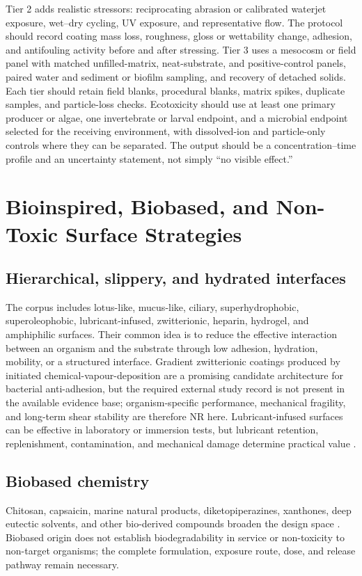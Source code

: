 Tier 2 adds realistic stressors: reciprocating abrasion or calibrated waterjet exposure, wet--dry cycling, UV exposure, and representative flow. The protocol should record coating mass loss, roughness, gloss or wettability change, adhesion, and antifouling activity before and after stressing. Tier 3 uses a mesocosm or field panel with matched unfilled-matrix, neat-substrate, and positive-control panels, paired water and sediment or biofilm sampling, and recovery of detached solids. Each tier should retain field blanks, procedural blanks, matrix spikes, duplicate samples, and particle-loss checks. Ecotoxicity should use at least one primary producer or algae, one invertebrate or larval endpoint, and a microbial endpoint selected for the receiving environment, with dissolved-ion and particle-only controls where they can be separated. The output should be a concentration--time profile and an uncertainty statement, not simply ``no visible effect.''

\section{Bioinspired, Biobased, and Non-Toxic Surface Strategies}
\subsection{Hierarchical, slippery, and hydrated interfaces}
The corpus includes lotus-like, mucus-like, ciliary, superhydrophobic, superoleophobic, lubricant-infused, zwitterionic, heparin, hydrogel, and amphiphilic surfaces. Their common idea is to reduce the effective interaction between an organism and the substrate through low adhesion, hydration, mobility, or a structured interface. Gradient zwitterionic coatings produced by initiated chemical-vapour-deposition are a promising candidate architecture for bacterial anti-adhesion, but the required external study record is not present in the available evidence base; organism-specific performance, mechanical fragility, and long-term shear stability are therefore NR here. Lubricant-infused surfaces can be effective in laboratory or immersion tests, but lubricant retention, replenishment, contamination, and mechanical damage determine practical value \cite{basu_green_2020,liu_antifouling_2023}.

\subsection{Biobased chemistry}
Chitosan, capsaicin, marine natural products, diketopiperazines, xanthones, deep eutectic solvents, and other bio-derived compounds broaden the design space \cite{grant_towards_2022}. Biobased origin does not establish biodegradability in service or non-toxicity to non-target organisms; the complete formulation, exposure route, dose, and release pathway remain necessary.

